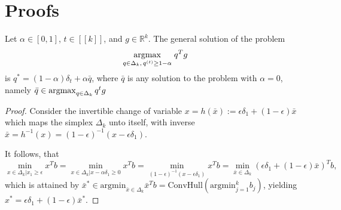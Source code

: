 \appendix
\section{Proofs}
\label{sec:proofs}
\begin{lemma}
Let  $\alpha \in [0, 1]$, $t \in [\![k]\!]$, and $g \in \mathbb R^k$. The
general solution of the problem
\begin{eqnarray}
  \underset{q \in \Delta_k,\, q^{(t)} \ge 1-\alpha}{\operatorname{argmax}}\; q^Tg
\end{eqnarray}
is $q^*=(1-\alpha) \delta_t + \alpha\bar{q}$, where $\bar{q}$ is any solution to
the problem with $\alpha=0$, namely $\bar{q} \in \operatorname{argmax}_{q \in \Delta_k}q^tg$
\label{thm:bumbednash}
\end{lemma}
\begin{proof}
Consider the invertible change of variable $x = h(\bar{x}):=\epsilon\delta_1 +
(1-\epsilon)\bar{x}$ which maps the simplex $\Delta_k$ unto itself, with inverse
$\bar{x} = h^{-1}(x)=(1-\epsilon)^{-1}(x-\epsilon\delta_1)$.

It follows, that
$$
\min_{x \in \Delta_k | x_1 \ge \epsilon}x^Tb=\min_{x \in \Delta_k |
  x-\alpha\delta_1 \ge
  0}x^Tb=\min_{(1-\epsilon)^{-1}(x-\epsilon\delta_1)}x^Tb=\min_{\bar{x} \in
  \Delta_k}(\epsilon\delta_1+(1-\epsilon)\bar{x})^Tb,
$$
which is attained by $\bar{x}^* \in \text{argmin}_{\bar{x} \in
  \Delta_k}\bar{x}^Tb=\text{ConvHull}(\text{argmin}_{j=1}^k b_j)$, yielding $
x^*=\epsilon\delta_1 + (1-\epsilon)\bar{x}^*$.
\end{proof}